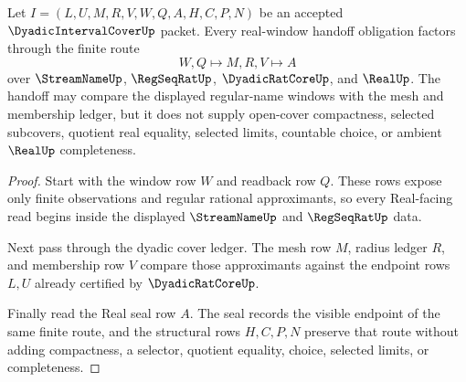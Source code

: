 \begin{theorem}
\label{thm:dyadic-interval-cover-real-window-handoff-obligation}
Let $I=(L,U,M,R,V,W,Q,A,H,C,P,N)$ be an accepted $\DyadicIntervalCoverUp$ packet. Every real-window handoff obligation factors through the finite route
$$
W,Q \longmapsto M,R,V \longmapsto A
$$
over $\StreamNameUp$, $\RegSeqRatUp$, $\DyadicRatCoreUp$, and $\RealUp$. The handoff may compare the displayed regular-name windows with the mesh and membership ledger, but it does not supply open-cover compactness, selected subcovers, quotient real equality, selected limits, countable choice, or ambient $\RealUp$ completeness.
\end{theorem}
\begin{proof}
Start with the window row $W$ and readback row $Q$. These rows expose only finite observations and regular rational approximants, so every Real-facing read begins inside the displayed $\StreamNameUp$ and $\RegSeqRatUp$ data.

Next pass through the dyadic cover ledger. The mesh row $M$, radius ledger $R$, and membership row $V$ compare those approximants against the endpoint rows $L,U$ already certified by $\DyadicRatCoreUp$.

Finally read the Real seal row $A$. The seal records the visible endpoint of the same finite route, and the structural rows $H,C,P,N$ preserve that route without adding compactness, a selector, quotient equality, choice, selected limits, or completeness.
\end{proof}

